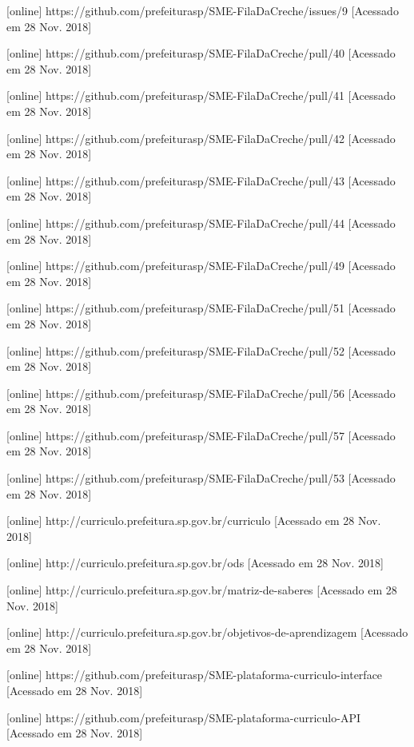 \documentclass[a4paper, 11pt]{article} %
\begin{document}
\begin{thebibliography}{9}
[online] https://github.com/prefeiturasp/SME-FilaDaCreche/issues/9 [Acessado em 28 Nov. 2018]

[online] https://github.com/prefeiturasp/SME-FilaDaCreche/pull/40 [Acessado em 28 Nov. 2018]

[online] https://github.com/prefeiturasp/SME-FilaDaCreche/pull/41 [Acessado em 28 Nov. 2018]

[online] https://github.com/prefeiturasp/SME-FilaDaCreche/pull/42 [Acessado em 28 Nov. 2018]

[online] https://github.com/prefeiturasp/SME-FilaDaCreche/pull/43 [Acessado em 28 Nov. 2018]

[online] https://github.com/prefeiturasp/SME-FilaDaCreche/pull/44 [Acessado em 28 Nov. 2018]

[online] https://github.com/prefeiturasp/SME-FilaDaCreche/pull/49 [Acessado em 28 Nov. 2018]

[online] https://github.com/prefeiturasp/SME-FilaDaCreche/pull/51 [Acessado em 28 Nov. 2018]

[online] https://github.com/prefeiturasp/SME-FilaDaCreche/pull/52 [Acessado em 28 Nov. 2018]

[online] https://github.com/prefeiturasp/SME-FilaDaCreche/pull/56 [Acessado em 28 Nov. 2018]

[online] https://github.com/prefeiturasp/SME-FilaDaCreche/pull/57 [Acessado em 28 Nov. 2018]

[online] https://github.com/prefeiturasp/SME-FilaDaCreche/pull/53 [Acessado em 28 Nov. 2018]

[online] http://curriculo.prefeitura.sp.gov.br/curriculo [Acessado em 28 Nov. 2018]

[online] http://curriculo.prefeitura.sp.gov.br/ods [Acessado em 28 Nov. 2018]

[online] http://curriculo.prefeitura.sp.gov.br/matriz-de-saberes [Acessado em 28 Nov. 2018]

[online] http://curriculo.prefeitura.sp.gov.br/objetivos-de-aprendizagem [Acessado em 28 Nov. 2018]

[online] https://github.com/prefeiturasp/SME-plataforma-curriculo-interface [Acessado em 28 Nov. 2018]

[online] https://github.com/prefeiturasp/SME-plataforma-curriculo-API [Acessado em 28 Nov. 2018]


\end{thebibliography}
\end{document}
